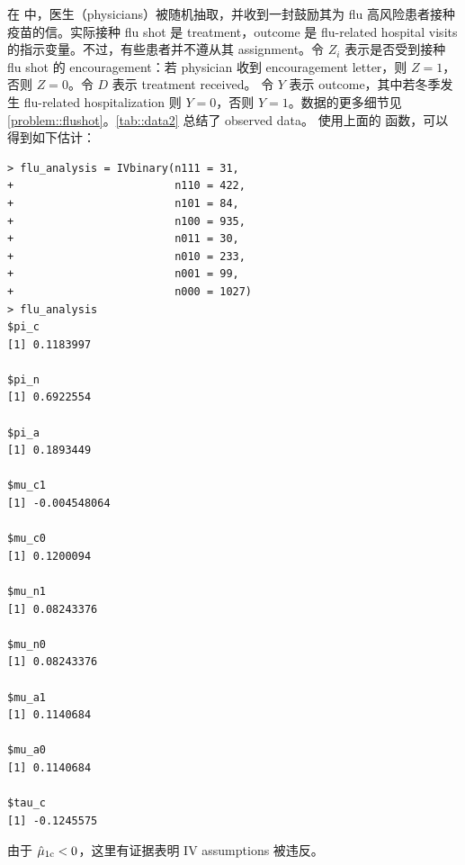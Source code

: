 \begin{example}\label{eg::2-iv-inequalities}
在 \citet{hirano2000assessing} 中，医生（physicians）被随机抽取，并收到一封鼓励其为 flu 高风险患者接种疫苗的信。实际接种 flu shot 是 treatment，outcome 是 flu-related hospital visits 的指示变量。不过，有些患者并不遵从其 assignment。令 $Z_i$ 表示是否受到接种 flu shot 的 encouragement：若 physician 收到 encouragement letter，则 $Z=1$，否则 $Z=0$。令 $D$ 表示 treatment received。
令 $Y$ 表示 outcome，其中若冬季发生 flu-related hospitalization 则 $Y=0$，否则 $Y=1$。数据的更多细节见 \cref{problem::flushot}。\cref{tab::data2} 总结了 observed data。
使用上面的  函数，可以得到如下估计：
\begin{lstlisting}
> flu_analysis = IVbinary(n111 = 31,
+                         n110 = 422,
+                         n101 = 84,
+                         n100 = 935,
+                         n011 = 30,
+                         n010 = 233,
+                         n001 = 99,
+                         n000 = 1027)
> flu_analysis
$pi_c
[1] 0.1183997

$pi_n
[1] 0.6922554

$pi_a
[1] 0.1893449

$mu_c1
[1] -0.004548064

$mu_c0
[1] 0.1200094

$mu_n1
[1] 0.08243376

$mu_n0
[1] 0.08243376

$mu_a1
[1] 0.1140684

$mu_a0
[1] 0.1140684

$tau_c
[1] -0.1245575
\end{lstlisting}
由于 $\hat\mu_{1\textup{c}} < 0$，这里有证据表明 IV assumptions 被违反。
\end{example} 




